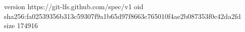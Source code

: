 version https://git-lfs.github.com/spec/v1
oid sha256:fa02539356b313c59307f9a1b65d97f8663c765010f4ae2b087353f0c42da2fd
size 174916
